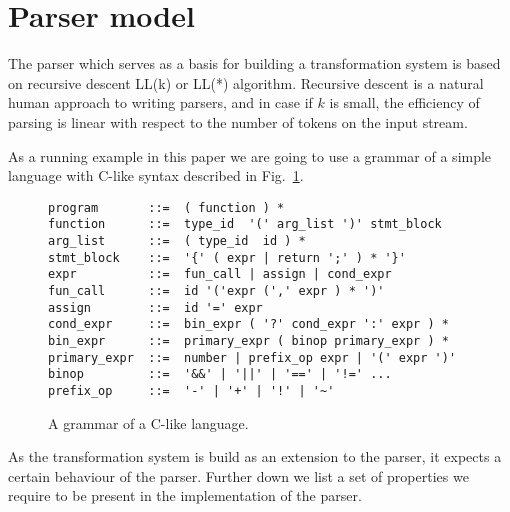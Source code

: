 \section{\label{sec:parser}Parser model}

The parser which serves as a basis for building a transformation 
system is 
based on recursive descent LL(k) or LL(*) algorithm.  Recursive
descent is a natural human approach to writing parsers, and in
case if $k$ is small, the efficiency of parsing is linear with
respect to the number of tokens on the input stream. 

As a running example in this paper we are going to use a
grammar of a simple language with C-like syntax described in
Fig.~\ref{fig:grammar}.

\begin{figure}[h!]
\centering
\begin{verbatim}
program       ::=  ( function ) * 
function      ::=  type_id  '(' arg_list ')' stmt_block 
arg_list      ::=  ( type_id  id ) * 
stmt_block    ::=  '{' ( expr | return ';' ) * '}' 
expr          ::=  fun_call | assign | cond_expr 
fun_call      ::=  id '('expr (',' expr ) * ')' 
assign        ::=  id '=' expr 
cond_expr     ::=  bin_expr ( '?' cond_expr ':' expr ) * 
bin_expr      ::=  primary_expr ( binop primary_expr ) *
primary_expr  ::=  number | prefix_op expr | '(' expr ')' 
binop         ::=  '&&' | '||' | '==' | '!=' ... 
prefix_op     ::=  '-' | '+' | '!' | '~' 
\end{verbatim}
\caption{\label{fig:grammar}A grammar of a C-like language.}
\end{figure}

\noindent
As the transformation system is build as an extension to the parser, 
it expects a certain behaviour of the parser.  Further down
we list a set of properties we require to be present in the 
implementation of the parser.

